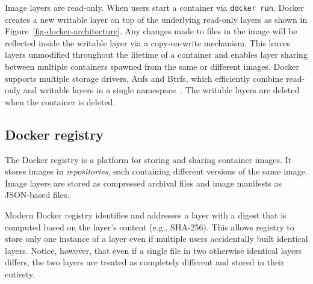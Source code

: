 Image layers are read-only.
%
When users start a container via {\tt docker run}, Docker creates a new
writable layer on top of the underlying read-only layers as shown in
Figure~\ref{fig-docker-architecture}.
%
Any changes made to files in the image will be reflected inside the writable
layer via a copy-on-write mechanism.
%
This leaves layers unmodified throughout the lifetime of a container and
enables layer sharing between multiple containers spawned from the same or
different images.
%
Docker supports multiple storage drivers, \eg Aufs and Btrfs, which efficiently
combine read-only and writable layers in a single
namespace~\cite{docker-driver-eval}.
%
The writable layers are deleted when the container is deleted.



\subsection{Docker registry}
\label{sec:docker-registry}

The Docker registry is a platform for storing and sharing container images.
%
It stores images in \emph{repositories}, each containing different versions of
the same image.
%
Image layers are stored as compressed archival files and image manifests as
JSON-based files.
%
%

Modern Docker registry identifies and addresses a layer with a digest that is
computed based on the layer's content (e.g., SHA-256).
%
This allows registry to store only one instance of a layer even if multiple
users accidentally built identical layers.
%
Notice, however, that even if a single file in two otherwise identical layers
differs, the two layers are treated as completely different and stored in their
entirety.


